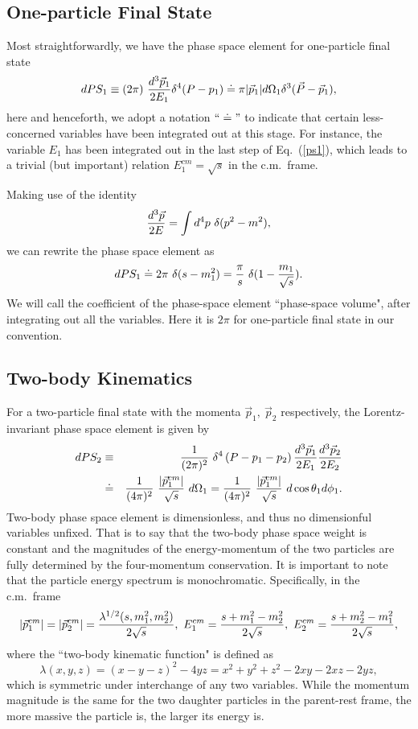 \documentclass[prd,aps,floats,preprintnumbers,preprint,superscriptaddress,floatfix,nofootinbib]{revtex4}
\def\vp{{\vec p}}
\def\be{\begin{equation}}
\def\ee{\end{equation}}
\def\bea{\begin{eqnarray}}
\def\eea{\end{eqnarray}}
\begin{document}
\subsection{One-particle Final State}
\label{one-body}
Most straightforwardly, we have the phase space element for one-particle final state
\be
dPS_1\equiv (2\pi)\ {d^3\vec p_1\over 2E_1} \delta^4 (P-p_1) \doteq
\pi | \vec p_1| d\Omega_1 \delta^3 (\vec P-\vec p_1),
\label{ps1}
\ee
here and henceforth, we adopt a notation $``\doteq"$ to indicate that certain less-concerned
variables have been integrated out at this stage. For instance, the variable $E_1$ has
been integrated out in the last step of Eq.~(\ref{ps1}), which leads to a trivial (but
important) relation $E^{cm}_1=\sqrt s$ in the c.m.~frame. 

Making use of the identity
\be
{d^3\vec p\over 2E} = \int d^4p\  \delta(p^2-m^2), 
\ee
we can rewrite the phase space element as
\be
dPS_1\doteq 2\pi\  \delta(s-m_1^2)= {\pi \over s}\  \delta(1-{m_1\over \sqrt s}).
\ee
We will call the coefficient of the phase-space element  ``phase-space volume", 
after integrating out all the variables. 
Here it is $2\pi$ for one-particle final state in our convention.

\subsection{Two-body Kinematics}
\label{two-body}

For a two-particle final state with the momenta $\vp_1,\ \vp_2$ respectively, 
the Lorentz-invariant phase space element  is given by
\bea
\nonumber
dPS_2 &\equiv&  {1\over (2\pi)^2}\ 
\delta^4\left(P- p_1-p_2 \right) {d^3\vec p_1\over 2E_1}  {d^3\vec p_2\over 2E_2} \\
 &\doteq & {1\over (4\pi)^2}\  {|\vp_1^{cm}|\over \sqrt s} \ d\Omega_1 
 = {1\over (4\pi)^2}\  {|\vp_1^{cm}|\over \sqrt s}\  d\cos\theta_1 d\phi_1.
\label{ps2}
\eea
Two-body phase space element is dimensionless, and thus no dimensionful 
variables unfixed.  That is to say that the two-body phase space weight is 
constant and the magnitudes of 
the energy-momentum of the two particles are fully
determined by the four-momentum conservation. 
It is important to note that the particle energy spectrum is monochromatic. 
Specifically, in the c.m.~frame
\bea
|\vp_1^{cm}| = |\vp_2^{cm}|={\lambda^{1/2}(s,m_1^2,m_2^2)\over 2\sqrt s},\ 
E_1^{cm}={s+m_1^2-m_2^2\over 2\sqrt s} ,\ 
E_2^{cm}={s+m_2^2-m_1^2\over 2\sqrt s} ,
\nonumber
\eea
where the ``two-body kinematic function" is defined as
\be
\lambda(x,y,z)=(x-y-z)^2-4yz=x^2+y^2+z^2-2xy-2xz-2yz,
\ee
which is symmetric under interchange of any two variables.
While the momentum magnitude is the same for the two
daughter particles in the parent-rest frame, the more massive
the particle  is, the  larger its energy is.
\end{document}
